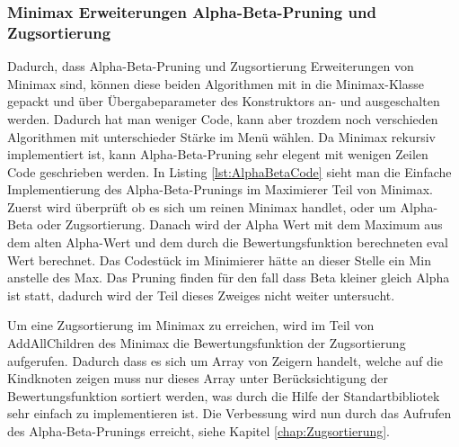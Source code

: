 \documentclass[12pt,a4paper,bibliography=totocnumbered,listof=totocnumbered]{article}
\begin{document}
\subsubsection{Minimax Erweiterungen Alpha-Beta-Pruning und Zugsortierung}
Dadurch, dass Alpha-Beta-Pruning und Zugsortierung Erweiterungen von Minimax sind, können diese beiden Algorithmen mit in die Minimax-Klasse gepackt
und über Übergabeparameter des Konstruktors an- und ausgeschalten werden. Dadurch hat man weniger Code, kann aber trozdem noch 
verschieden Algorithmen mit unterschieder Stärke im Menü wählen. Da Minimax rekursiv implementiert ist, kann Alpha-Beta-Pruning sehr elegent mit wenigen 
Zeilen Code geschrieben werden. In Listing \ref{lst:AlphaBetaCode} sieht man die Einfache Implementierung des Alpha-Beta-Prunings im Maximierer Teil 
von Minimax. Zuerst wird überprüft ob es sich um reinen Minimax handlet, oder um Alpha-Beta oder Zugsortierung. Danach wird der Alpha Wert mit dem
Maximum aus dem alten Alpha-Wert und dem durch die Bewertungsfunktion berechneten eval Wert berechnet. Das Codestück im Minimierer hätte an dieser Stelle 
ein Min anstelle des Max. Das Pruning finden für den fall dass Beta kleiner gleich Alpha ist statt, dadurch wird der Teil dieses Zweiges nicht weiter untersucht.
\vspace{1em}


Um eine Zugsortierung im Minimax zu erreichen, wird im Teil von AddAllChildren des Minimax die Bewertungsfunktion der Zugsortierung aufgerufen.
Dadurch dass es sich um Array von Zeigern handelt, welche auf die Kindknoten zeigen muss nur dieses Array unter Berücksichtigung der Bewertungsfunktion
sortiert werden, was durch die Hilfe der Standartbibliotek sehr einfach zu implementieren ist.  
Die Verbessung wird nun durch das Aufrufen des Alpha-Beta-Prunings erreicht, siehe Kapitel \ref{chap:Zugsortierung}.
\end{document}
